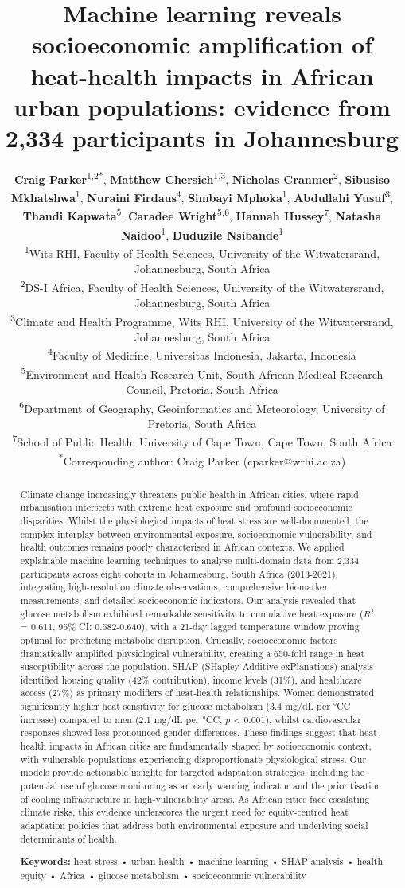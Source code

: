 \documentclass[11pt,a4paper]{article}
\title{\Large \textbf{Machine learning reveals socioeconomic amplification of heat-health impacts in African urban populations: evidence from 2,334 participants in Johannesburg}}
\author{
\textbf{Craig Parker}\textsuperscript{1,2*}, 
\textbf{Matthew Chersich}\textsuperscript{1,3}, 
\textbf{Nicholas Cranmer}\textsuperscript{2}, 
\textbf{Sibusiso Mkhatshwa}\textsuperscript{1}, 
\textbf{Nuraini Firdaus}\textsuperscript{4}, 
\textbf{Simbayi Mphoka}\textsuperscript{1}, 
\textbf{Abdullahi Yusuf}\textsuperscript{3}, 
\textbf{Thandi Kapwata}\textsuperscript{5}, 
\textbf{Caradee Wright}\textsuperscript{5,6}, 
\textbf{Hannah Hussey}\textsuperscript{7}, 
\textbf{Natasha Naidoo}\textsuperscript{1}, 
\textbf{Duduzile Nsibande}\textsuperscript{1}\\[0.5em]
\small
\textsuperscript{1}Wits RHI, Faculty of Health Sciences, University of the Witwatersrand, Johannesburg, South Africa\\
\textsuperscript{2}DS-I Africa, Faculty of Health Sciences, University of the Witwatersrand, Johannesburg, South Africa\\
\textsuperscript{3}Climate and Health Programme, Wits RHI, University of the Witwatersrand, Johannesburg, South Africa\\
\textsuperscript{4}Faculty of Medicine, Universitas Indonesia, Jakarta, Indonesia\\
\textsuperscript{5}Environment and Health Research Unit, South African Medical Research Council, Pretoria, South Africa\\
\textsuperscript{6}Department of Geography, Geoinformatics and Meteorology, University of Pretoria, South Africa\\
\textsuperscript{7}School of Public Health, University of Cape Town, Cape Town, South Africa\\[0.5em]
\textsuperscript{*}Corresponding author: Craig Parker (cparker@wrhi.ac.za)
}
\date{}
\newcommand{\degrees}{°C}
\begin{document}
\maketitle

\begin{abstract}
\noindent Climate change increasingly threatens public health in African cities, where rapid urbanisation intersects with extreme heat exposure and profound socioeconomic disparities. Whilst the physiological impacts of heat stress are well-documented, the complex interplay between environmental exposure, socioeconomic vulnerability, and health outcomes remains poorly characterised in African contexts. We applied explainable machine learning techniques to analyse multi-domain data from 2,334 participants across eight cohorts in Johannesburg, South Africa (2013-2021), integrating high-resolution climate observations, comprehensive biomarker measurements, and detailed socioeconomic indicators. Our analysis revealed that glucose metabolism exhibited remarkable sensitivity to cumulative heat exposure ($R^2$ = 0.611, 95\% CI: 0.582-0.640), with a 21-day lagged temperature window proving optimal for predicting metabolic disruption. Crucially, socioeconomic factors dramatically amplified physiological vulnerability, creating a 650-fold range in heat susceptibility across the population. SHAP (SHapley Additive exPlanations) analysis identified housing quality (42\% contribution), income levels (31\%), and healthcare access (27\%) as primary modifiers of heat-health relationships. Women demonstrated significantly higher heat sensitivity for glucose metabolism (3.4 mg/dL per \degrees C increase) compared to men (2.1 mg/dL per \degrees C, $p$ < 0.001), whilst cardiovascular responses showed less pronounced gender differences. These findings suggest that heat-health impacts in African cities are fundamentally shaped by socioeconomic context, with vulnerable populations experiencing disproportionate physiological stress. Our models provide actionable insights for targeted adaptation strategies, including the potential use of glucose monitoring as an early warning indicator and the prioritisation of cooling infrastructure in high-vulnerability areas. As African cities face escalating climate risks, this evidence underscores the urgent need for equity-centred heat adaptation policies that address both environmental exposure and underlying social determinants of health.

\vspace{0.5em}
\noindent \textbf{Keywords:} heat stress • urban health • machine learning • SHAP analysis • health equity • Africa • glucose metabolism • socioeconomic vulnerability
\end{abstract}
\end{document}
